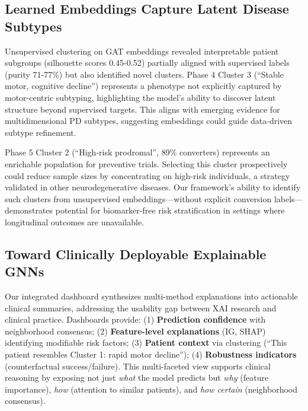 \subsection{Learned Embeddings Capture Latent Disease Subtypes}

Unsupervised clustering on GAT embeddings revealed interpretable patient subgroups (silhouette scores 0.45-0.52) partially aligned with supervised labels (purity 71-77\%) but also identified novel clusters. Phase 4 Cluster 3 (``Stable motor, cognitive decline'') represents a phenotype not explicitly captured by motor-centric subtyping, highlighting the model's ability to discover latent structure beyond supervised targets\cite{schulam2019can}. This aligns with emerging evidence for multidimensional PD subtypes\cite{fereshtehnejad2017subtypes,lawton2018developing}, suggesting embeddings could guide data-driven subtype refinement.

Phase 5 Cluster 2 (``High-risk prodromal'', 89\% converters) represents an enrichable population for preventive trials. Selecting this cluster prospectively could reduce sample sizes by concentrating on high-risk individuals, a strategy validated in other neurodegenerative diseases\cite{donohue2014preclinical}. Our framework's ability to identify such clusters from unsupervised embeddings—without explicit conversion labels—demonstrates potential for biomarker-free risk stratification in settings where longitudinal outcomes are unavailable\cite{schulam2019can}.

\subsection{Toward Clinically Deployable Explainable GNNs}

Our integrated dashboard synthesizes multi-method explanations into actionable clinical summaries, addressing the usability gap between XAI research and clinical practice\cite{holzinger2019causability}. Dashboards provide: (1) \textbf{Prediction confidence} with neighborhood consensus; (2) \textbf{Feature-level explanations} (IG, SHAP) identifying modifiable risk factors; (3) \textbf{Patient context} via clustering (``This patient resembles Cluster 1: rapid motor decline''); (4) \textbf{Robustness indicators} (counterfactual success/failure). This multi-faceted view supports clinical reasoning by exposing not just \textit{what} the model predicts but \textit{why} (feature importance), \textit{how} (attention to similar patients), and \textit{how certain} (neighborhood consensus).

